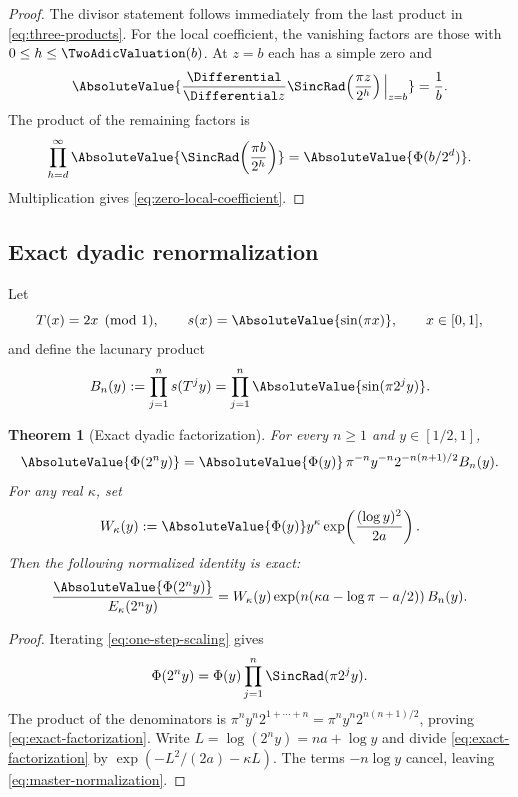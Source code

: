 \documentclass[11pt,oneside]{article}
\newtheorem{theorem}{Theorem}[section]
\theoremstyle{definition}
\theoremstyle{remark}
\newcommand{\Phiup}{\Phi}
\begin{document}
\begin{proof}
The divisor statement follows immediately from the last product in
\eqref{eq:three-products}.  For the local coefficient, the vanishing factors are those with
$0\le h\le\TwoAdicValuation(b)$.  At $z=b$ each has a simple zero and
\[
 \AbsoluteValue{\frac{\Differential}{\Differential z}\SincRad\!\left(\frac{\pi z}{2^h}\right)\Big|_{z=b}}
 =\frac1b.
\]
The product of the remaining factors is
\[
 \prod_{h=d}^{\infty}
 \AbsoluteValue{\SincRad\!\left(\frac{\pi b}{2^h}\right)}
 =\AbsoluteValue{\Phiup(b/2^d)}.
\]
Multiplication gives \eqref{eq:zero-local-coefficient}.
\end{proof}

\subsection{Exact dyadic renormalization}
\label{subsec:dyadic-renormalization}

Let
\[
 T(x)=2x\pmod1,
 \qquad
 s(x)=\AbsoluteValue{\sin(\pi x)},
 \qquad x\in[0,1],
\]
and define the lacunary product
\begin{equation}
 B_n(y):=\prod_{j=1}^{n}s(T^j y)
 =\prod_{j=1}^{n}\AbsoluteValue{\sin(\pi2^j y)}.
 \label{eq:Bny}
\end{equation}

\begin{theorem}[Exact dyadic factorization]
\label{thm:exact-dyadic-factorization}
For every $n\ge1$ and $y\in[1/2,1]$,
\begin{equation}
 \AbsoluteValue{\Phiup(2^n y)}
 =\AbsoluteValue{\Phiup(y)}\,\pi^{-n}y^{-n}2^{-n(n+1)/2}B_n(y).
 \label{eq:exact-factorization}
\end{equation}
For any real $\kappa$, set
\begin{equation}
 W_\kappa(y)
 :=\AbsoluteValue{\Phiup(y)}y^\kappa
   \exp\!\left(\frac{(\log y)^2}{2a}\right).
 \label{eq:W-kappa}
\end{equation}
Then the following normalized identity is exact:
\begin{equation}
 \frac{\AbsoluteValue{\Phiup(2^n y)}}{E_\kappa(2^n y)}
 =W_\kappa(y)
  \exp\!\left(n(\kappa a-\log\pi-a/2)\right)B_n(y).
 \label{eq:master-normalization}
\end{equation}
\end{theorem}

\begin{proof}
Iterating \eqref{eq:one-step-scaling} gives
\[
 \Phiup(2^n y)=\Phiup(y)\prod_{j=1}^{n}\SincRad(\pi2^j y).
\]
The product of the denominators is
$\pi^ny^n2^{1+\cdots+n}=\pi^ny^n2^{n(n+1)/2}$, proving
\eqref{eq:exact-factorization}.  Write $L=\log(2^ny)=na+\log y$ and divide
\eqref{eq:exact-factorization} by
$\exp(-L^2/(2a)-\kappa L)$.  The terms $-n\log y$ cancel, leaving
\eqref{eq:master-normalization}.
\end{proof}
\end{document}
